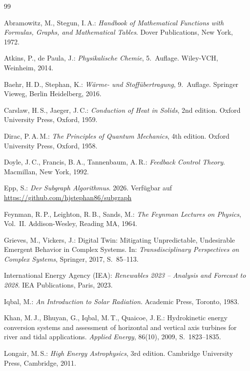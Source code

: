 ﻿\documentclass[a4paper,12pt]{article}
\theoremstyle{definition}
\begin{document}
\begin{thebibliography}{99}

Abramowitz, M., Stegun, I.\,A.:
\textit{Handbook of Mathematical Functions with Formulas, Graphs, and Mathematical Tables}.
Dover Publications, New York, 1972.

Atkins, P., de Paula, J.:
\textit{Physikalische Chemie}, 5.~Auflage.
Wiley-VCH, Weinheim, 2014.

Baehr, H.\,D., Stephan, K.:
\textit{W\"arme- und Stoff\"ubertragung}, 9.~Auflage.
Springer Vieweg, Berlin Heidelberg, 2016.

Carslaw, H.\,S., Jaeger, J.\,C.:
\textit{Conduction of Heat in Solids}, 2nd edition.
Oxford University Press, Oxford, 1959.

Dirac, P.\,A.\,M.:
\textit{The Principles of Quantum Mechanics}, 4th edition.
Oxford University Press, Oxford, 1958.

Doyle, J.\,C., Francis, B.\,A., Tannenbaum, A.\,R.:
\textit{Feedback Control Theory}.
Macmillan, New York, 1992.

Epp, S.:
\textit{Der Subgraph Algorithmus}. 2026. Verfügbar auf \url{https://github.com/hjstephan86/subgraph}

Feynman, R.\,P., Leighton, R.\,B., Sands, M.:
\textit{The Feynman Lectures on Physics}, Vol.~II.
Addison-Wesley, Reading MA, 1964.

Grieves, M., Vickers, J.:
Digital Twin: Mitigating Unpredictable, Undesirable Emergent Behavior in Complex Systems.
In: \textit{Transdisciplinary Perspectives on Complex Systems}, Springer, 2017, S.~85--113.

International Energy Agency (IEA):
\textit{Renewables 2023 -- Analysis and Forecast to 2028}.
IEA Publications, Paris, 2023.

Iqbal, M.:
\textit{An Introduction to Solar Radiation}.
Academic Press, Toronto, 1983.

Khan, M.\,J., Bhuyan, G., Iqbal, M.\,T., Quaicoe, J.\,E.:
Hydrokinetic energy conversion systems and assessment of horizontal and vertical axis turbines for river and tidal applications.
\textit{Applied Energy}, 86(10), 2009, S.~1823--1835.

Longair, M.\,S.:
\textit{High Energy Astrophysics}, 3rd edition.
Cambridge University Press, Cambridge, 2011.


\end{thebibliography}
\end{document}

